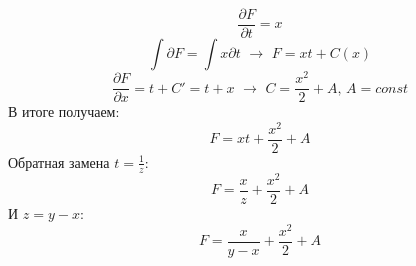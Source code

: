 \documentclass[a5paper, 10pt]{article}
\theoremstyle{definition}
\theoremstyle{plain}
\theoremstyle{remark}
\begin{document}
\begin{equation*}
\frac{\partial F}{\partial t} = x
\end{equation*}
\begin{equation*}
\int \partial F = \int x \partial t \, \, \to \, \, F = xt + C(x)
\end{equation*}
\begin{equation*}
\frac{\partial F}{\partial x} = t + C' =  t + x  \, \, \to \, \, C = \frac{x^2}{2} + A, \, A = const
\end{equation*}
В итоге получаем:
\begin{equation*}
F =  xt +  \frac{x^2}{2} + A
\end{equation*}
Обратная замена $t = \frac{1}{z}$:
\begin{equation*}
F =   \frac{x}{z} +  \frac{x^2}{2} + A
\end{equation*}
И $ z = y - x$:
\begin{equation*}
F =   \frac{x}{y - x} +  \frac{x^2}{2} + A
\end{equation*}
\end{document}
